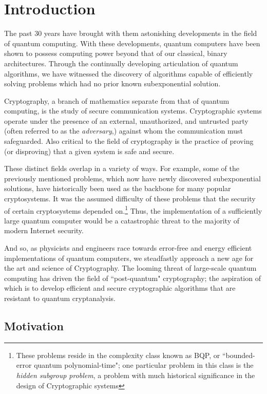 \chapter{Introduction}

The past 30 years have brought with them astonishing developments in the field of quantum computing. With these developments, quantum computers have been shown to possess computing power beyond that of our classical, binary architectures. Through the continually developing articulation of quantum algorithms, we have witnessed the discovery of algorithms capable of efficiently solving problems which had no prior known subexponential solution. 

Cryptography, a branch of mathematics separate from that of quantum computing, is the study of secure communication systems. Cryptographic systems operate under the presence of an external, unauthorized, and untrusted party (often referred to as the \textit{adversary},) against whom the communication must safeguarded. Also critical to the field of cryptography is the practice of proving (or disproving) that a given system is safe and secure.

These distinct fields overlap in a variety of ways. For example, some of the previously mentioned problems, which now have newly discovered subexponential solutions, have historically been used as the backbone for many popular cryptosystems. It was the assumed difficulty of these problems that the security of certain cryptosystems depended on.\footnote{These problems reside in the complexity class known as BQP, or ``bounded-error quantum polynomial-time"; one particular problem in this class is the \textit{hidden subgroup problem}, a problem with much historical significance in the design of Cryptographic systems} Thus, the implementation of a sufficiently large quantum computer would be a catastrophic threat to the majority of modern Internet security.  

And so, as physicists and engineers race towards error-free and energy efficient implementations of quantum computers, we steadfastly approach a new age for the art and science of Cryptography. The looming threat of large-scale quantum computing has driven the field of ``post-quantum" cryptography; the aspiration of which is to develop efficient and secure cryptographic algorithms that are resistant to quantum cryptanalysis.\\

\section{Motivation}
\label{sec:motivation}

